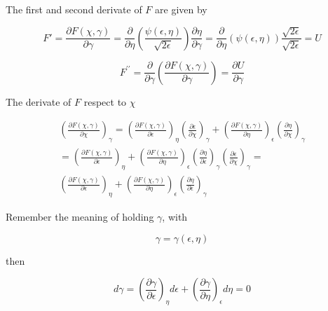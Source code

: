 The first and second derivate  of  $F$ are given by 

\begin{equation*} 
F'=
\frac{\partial F(\chi,\gamma)}{\partial \gamma}
=
\frac{\partial }{\partial \eta}
\left(
    \frac{\psi(\epsilon,\eta)}{\sqrt{2\epsilon}}
\right)
\frac{\partial \eta}{\partial \gamma}
=
\frac{\partial }{\partial \eta}
\left(
    \psi(\epsilon,\eta)
\right)
\frac{\sqrt{2\epsilon}}
{\sqrt{2\epsilon}}
=
U
\end{equation*}  

\begin{equation*} 
F^{\prime\prime}=
\frac{\partial }{\partial \gamma}
\left(
\frac{\partial F(\chi,\gamma)}{\partial \gamma}
\right)
=
\frac{\partial U}{\partial \gamma}
\end{equation*} 

The derivate of $F$ respect to $\chi$

\begin{equation*} 
\begin{split}  
\left(
    \frac{\partial F(\chi,\gamma)}{\partial \chi}
\right)_\gamma
=
\left(
\frac{\partial F(\chi,\gamma)}{\partial \epsilon}
\right)_\eta
\left(
\frac{\partial \epsilon}{\partial \chi}
\right)_\gamma
+
\left(
\frac{\partial F(\chi,\gamma)}{\partial \eta}
\right)_\epsilon
\left(
\frac{\partial \eta}{\partial \chi}
\right)_\gamma
\\
=
\left(
\frac{\partial F(\chi,\gamma)}{\partial \epsilon}
\right)_\eta
+
\left(
\frac{\partial F(\chi,\gamma)}{\partial \eta}
\right)_\epsilon
\left(
\frac{\partial \eta}{\partial \epsilon}
\right)_\gamma
\left(
\frac{\partial \epsilon}{\partial \chi}
\right)_\gamma
=
\\
\left(
\frac{\partial F(\chi,\gamma)}{\partial \epsilon}
\right)_\eta
+
\left(
\frac{\partial F(\chi,\gamma)}{\partial \eta}
\right)_\epsilon
\left(
\frac{\partial \eta}{\partial \epsilon}
\right)_\gamma
\end{split}  
\end{equation*}  

Remember the meaning of holding  $\gamma$, 
with 

\begin{equation*} 
\gamma=\gamma(\epsilon,\eta)
\end{equation*}  

then

\begin{equation*} 
d\gamma
=
\left(
\frac{\partial \gamma}{\partial \epsilon}
\right)_\eta
d\epsilon
+
\left(
\frac{\partial \gamma}{\partial \eta}
\right)_\epsilon
d\eta
=
0
\end{equation*}  

